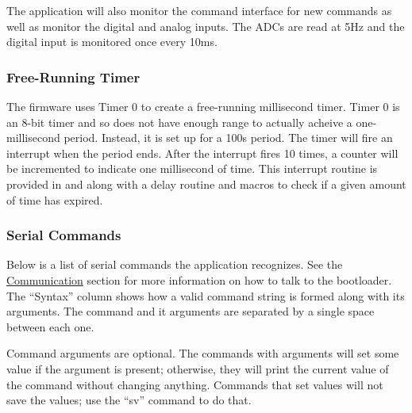 \documentclass{article}
\begin{document}
The application will also monitor the command interface for new commands as well as monitor the
digital and analog inputs.  The ADCs are read at 5Hz and the digital input is monitored once every
10ms.

\subsubsection{Free-Running Timer} \label{sssec:FWAppTimer}
The firmware uses Timer 0 to create a free-running millisecond timer.  Timer 0 is an 8-bit timer and
so does not have enough range to actually acheive a one-millisecond period.  Instead, it is set up
for a 100\textmu s period.  The timer will fire an interrupt when the period ends.  After the
interrupt fires 10 times, a counter will be incremented to indicate one millisecond of time.  This
interrupt routine is provided in  and  along
with a delay routine and macros to check if a given amount of time has expired.

\subsubsection{Serial Commands} \label{sssec:FWAppCommands}
Below is a list of serial commands the application recognizes.  See the
\hyperref[ssec:FWComm]{Communication} section for more information on how to talk to the bootloader.
The ``Syntax'' column shows how a valid command string is formed along with its arguments.  The
command and it arguments are separated by a single space between each one.

Command arguments are optional.  The commands with arguments will set some value if the argument is
present; otherwise, they will print the current value of the command without changing anything.
Commands that set values will not save the values; use the ``sv'' command to do that.
\end{document}

